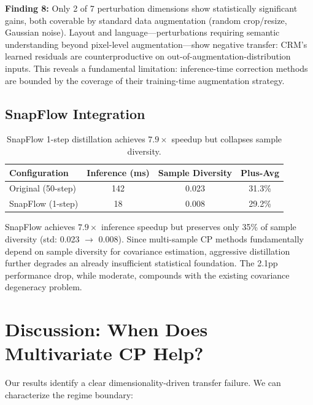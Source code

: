 \documentclass[letterpaper]{article}
\begin{document}
\textbf{Finding 8:} Only 2 of 7 perturbation dimensions show statistically significant gains, both coverable by standard data augmentation (random crop/resize, Gaussian noise). Layout and language---perturbations requiring semantic understanding beyond pixel-level augmentation---show negative transfer: CRM's learned residuals are counterproductive on out-of-augmentation-distribution inputs. This reveals a fundamental limitation: inference-time correction methods are bounded by the coverage of their training-time augmentation strategy.

\subsection{SnapFlow Integration}
\label{sec:exp-snapflow}

\begin{table}[h]
\centering
\caption{SnapFlow 1-step distillation achieves $7.9\times$ speedup but collapses sample diversity.}
\label{tab:snap}
\begin{tabular}{lccc}
\toprule
Configuration & Inference (ms) & Sample Diversity & Plus-Avg \\
\midrule
Original (50-step) & 142 & 0.023 & 31.3\% \\
SnapFlow (1-step) & 18 & 0.008 & 29.2\% \\
\bottomrule
\end{tabular}
\end{table}

SnapFlow achieves $7.9\times$ inference speedup but preserves only 35\% of sample diversity (std: 0.023 $\to$ 0.008). Since multi-sample CP methods fundamentally depend on sample diversity for covariance estimation, aggressive distillation further degrades an already insufficient statistical foundation. The 2.1pp performance drop, while moderate, compounds with the existing covariance degeneracy problem.

\section{Discussion: When Does Multivariate CP Help?}
\label{sec:discussion}

Our results identify a clear dimensionality-driven transfer failure. We can characterize the regime boundary:
\end{document}
